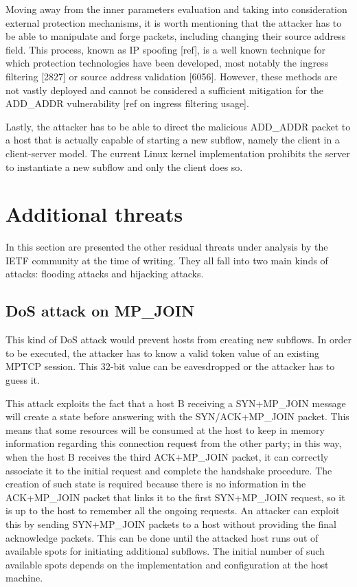 Moving away from the inner parameters evaluation and taking into consideration external protection mechanisms, it is worth mentioning that the attacker has to be able to manipulate and forge packets, including changing their source address field. This process, known as IP spoofing [ref], is a well known technique for which protection technologies have been developed, most notably the ingress filtering [2827] or source address validation [6056]. However, these methods are not vastly deployed and cannot be considered a sufficient mitigation for the ADD\_ADDR vulnerability [ref on ingress filtering usage].

Lastly, the attacker has to be able to direct the malicious ADD\_ADDR packet to a host that is actually capable of starting a new subflow, namely the client in a client-server model. The current Linux kernel implementation prohibits the server to instantiate a new subflow and only the client does so.

\section{Additional threats}
In this section are presented the other residual threats under analysis by the IETF community at the time of writing. They all fall into two main kinds of attacks: flooding attacks and hijacking attacks. 

\subsection{DoS attack on MP\_JOIN}
This kind of DoS attack would prevent hosts from creating new subflows. In order to be executed, the attacker has to know a valid token value of an existing MPTCP session. This 32-bit value can be eavesdropped or the attacker has to guess it.

This attack exploits the fact that a host B receiving a SYN+MP\_JOIN message will create a state before answering with the SYN/ACK+MP\_JOIN packet. This means that some resources will be consumed at the host to keep in memory information regarding this connection request from the other party; in this way, when the host B receives the third ACK+MP\_JOIN packet, it can correctly associate it to the initial request and complete the handshake procedure. The creation of such state is required because there is no information in the ACK+MP\_JOIN packet that links it to the first SYN+MP\_JOIN request, so it is up to the host to remember all the ongoing requests.
An attacker can exploit this by sending SYN+MP\_JOIN packets to a host without providing the final acknowledge packets. This can be done until the attacked host runs out of available spots for initiating additional subflows. The initial number of such available spots depends on the implementation and configuration at the host machine. 


